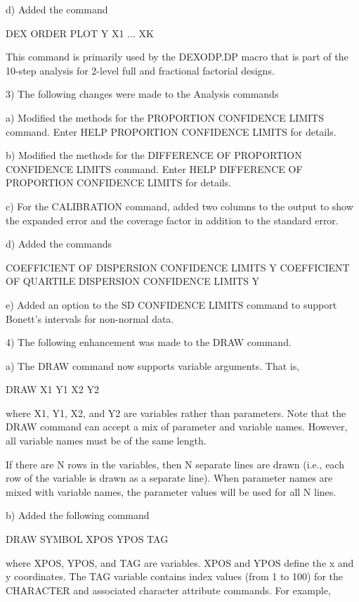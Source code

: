     d) Added the command

         DEX ORDER PLOT Y X1 ... XK

       This command is primarily used by the DEXODP.DP macro that is
       part of the 10-step analysis for 2-level full and fractional
       factorial designs.

 3) The following changes were made to the Analysis commands

    a) Modified the methods for the PROPORTION CONFIDENCE LIMITS
       command.  Enter HELP PROPORTION CONFIDENCE LIMITS for details.

    b) Modified the methods for the DIFFERENCE OF PROPORTION CONFIDENCE
       LIMITS command.  Enter HELP DIFFERENCE OF PROPORTION CONFIDENCE
       LIMITS for details.

    c) For the CALIBRATION command, added two columns to the output to
       show the expanded error and the coverage factor in addition to
       the standard error.

    d) Added the commands

           COEFFICIENT OF DISPERSION CONFIDENCE LIMITS Y
           COEFFICIENT OF QUARTILE DISPERSION CONFIDENCE LIMITS Y

    e) Added an option to the SD CONFIDENCE LIMITS command to
       support Bonett's intervals for non-normal data.

 4) The following enhancement was made to the DRAW command.

    a) The DRAW command now supports variable arguments.  That is,

           DRAW X1 Y1 X2 Y2

       where X1, Y1, X2, and Y2 are variables rather than parameters.
       Note that the DRAW command can accept a mix of parameter and
       variable names.  However, all variable names must be of the same
       length.

       If there are N rows in the variables, then N separate lines are
       drawn (i.e., each row of the variable is drawn as a separate line).
       When parameter names are mixed with variable names, the parameter
       values will be used for all N lines.

    b) Added the following command

           DRAW SYMBOL XPOS YPOS TAG

       where XPOS, YPOS, and TAG are variables.  XPOS and YPOS define
       the x and y coordinates.  The TAG variable contains index values
       (from 1 to 100) for the CHARACTER and associated character
       attribute commands.  For example,

